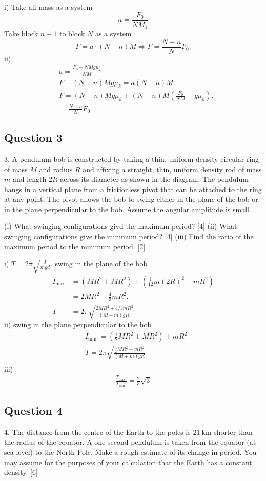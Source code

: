 \documentclass{article}
\begin{document}
i) Take all mass as a system
$$
a=\frac{F_0}{N M_1}
$$
Take block $n+1$ to block $N$ as a system
$$
F=a \cdot(N-n) M \Rightarrow F=\frac{N-n}{N} F_0 .
$$
ii)
$$
\begin{aligned}
& a=\frac{F_0-N M g \mu_k}{N M} \\
& F-(N-n) M g \mu_k=a(N-n) M \\
& F=(N-n) M g \mu_k+(N-n) M\left(\frac{F_0}{N M}-g \mu_k\right) . \\
&=\frac{N-n}{N} F_0 \quad \
\end{aligned}
$$

\subsection{Question 3}
3. A pendulum bob is constructed by taking a thin, uniform-density circular ring of mass $M$ and radius $R$ and affixing a straight, thin, uniform density rod of mass ${m}$ and length $2 R$ across its diameter as shown in the diagram. The pendulum hangs in a vertical plane from a frictionless pivot that can be attached to the ring at any point. The pivot allows the bob to swing either in the plane of the bob or in the plane perpendicular to the bob. Assume the angular amplitude is small.

(i) What swinging configurations givd the maximum period? [4]
(ii) What swinging configurations give the minimum period? [4]
(iii) Find the ratio of the maximum period to the minimum period. [2]

i) $T=2 \pi \sqrt{\frac{I}{m g d}}$.
swing in the plane of the bob
$$
\begin{aligned}
I_{\max } & =\left(M R^2+M R^2\right)+\left(\frac{1}{12} m(2 R)^2+m R^2\right) \\
& =2 M R^2+\frac{4}{3} m R^2 . \\
T & =2 \pi \sqrt{\frac{2 M R^2+4 / 3 m R^2}{(M+m) g R .}}
\end{aligned}
$$
ii) swing in the plane perpendicular to the hob
$$
\begin{aligned}
& I_{\text {min }}=\left(\frac{1}{2} M R^2+M R^2\right)+m R^2 \\
& T=2 \pi \sqrt{\frac{\frac{3}{2} M R^2+m R^2}{(M+m) g R}} \\
\end{aligned}
$$
iii)  
$$
\begin{aligned}
\frac{T_{\text {max }}}{T_{\text {min }}}=\frac{2}{3} \sqrt{3}
\end{aligned}
$$
\subsection{Question 4}
4. The distance from the centre of the Earth to the poles is $21 \mathrm{~km}$ shorter than the radius of the equator. A one second pendulum is taken from the equator (at sea level) to the North Pole. Make a rough estimate of its change in period. You may assume for the purposes of your calculation that the Earth has a constant density. [6]
\end{document}

